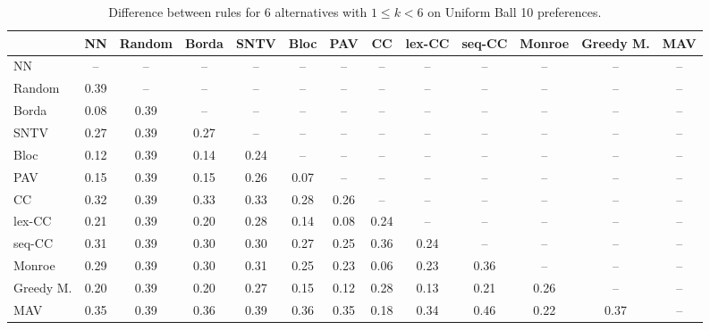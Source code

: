 
\begin{table*}[h!]
\centering
\begin{tabular}{lcccccccccccc}
\toprule
 & NN & Random & Borda & SNTV & Bloc & PAV & CC & lex-CC & seq-CC & Monroe & Greedy M. & MAV \\
\midrule
NN & -- & -- & -- & -- & -- & -- & -- & -- & -- & -- & -- & -- \\
Random & 0.39 & -- & -- & -- & -- & -- & -- & -- & -- & -- & -- & -- \\
Borda & 0.08 & 0.39 & -- & -- & -- & -- & -- & -- & -- & -- & -- & -- \\
SNTV & 0.27 & 0.39 & 0.27 & -- & -- & -- & -- & -- & -- & -- & -- & -- \\
Bloc & 0.12 & 0.39 & 0.14 & 0.24 & -- & -- & -- & -- & -- & -- & -- & -- \\
PAV & 0.15 & 0.39 & 0.15 & 0.26 & 0.07 & -- & -- & -- & -- & -- & -- & -- \\
CC & 0.32 & 0.39 & 0.33 & 0.33 & 0.28 & 0.26 & -- & -- & -- & -- & -- & -- \\
lex-CC & 0.21 & 0.39 & 0.20 & 0.28 & 0.14 & 0.08 & 0.24 & -- & -- & -- & -- & -- \\
seq-CC & 0.31 & 0.39 & 0.30 & 0.30 & 0.27 & 0.25 & 0.36 & 0.24 & -- & -- & -- & -- \\
Monroe & 0.29 & 0.39 & 0.30 & 0.31 & 0.25 & 0.23 & 0.06 & 0.23 & 0.36 & -- & -- & -- \\
Greedy M. & 0.20 & 0.39 & 0.20 & 0.27 & 0.15 & 0.12 & 0.28 & 0.13 & 0.21 & 0.26 & -- & -- \\
MAV & 0.35 & 0.39 & 0.36 & 0.39 & 0.36 & 0.35 & 0.18 & 0.34 & 0.46 & 0.22 & 0.37 & -- \\
\bottomrule
\end{tabular}

\caption{Difference between rules for 6 alternatives with $1 \leq k < 6$ on Uniform Ball 10 preferences.}
\end{table*}
